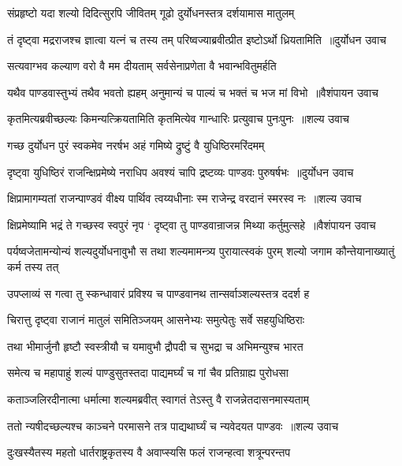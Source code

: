 \twolineshloka
{संप्रहृष्टो यदा शल्यो दिदित्सुरपि जीवितम्}
{गूढो दुर्योधनस्तत्र दर्शयामास मातुलम्}


\threelineshloka
{तं दृष्ट्वा मद्रराजश्च ज्ञात्वा यत्नं च तस्य तम्}
{परिष्वज्याब्रवीत्प्रीत इष्टोऽर्थो ध्रियतामिति ॥दुर्योधन उवाच}
{}


\twolineshloka
{सत्यवाग्भव कल्याण वरो वै मम दीयताम्}
{सर्वसेनाप्रणेता वै भवान्भवितुमर्हति}


\threelineshloka
{यथैव पाण्डवास्तुभ्यं तथैव भवतो ह्यहम्}
{अनुमान्यं च पाल्यं च भक्तं च भज मां विभो ॥वैशंपायन उवाच}
{}


\threelineshloka
{कृतमित्यब्रवीच्छल्यः किमन्यत्क्रियतामिति}
{कृतमित्येव गान्धारिः प्रत्युवाच पुनःपुनः ॥शल्य उवाच}
{}


\twolineshloka
{गच्छ दुर्योधन पुरं स्वकमेव नरर्षभ}
{अहं गमिष्ये द्रुष्टुं वै युधिष्ठिरमरिंदमम्}


\threelineshloka
{दृष्ट्वा युधिष्ठिरं राजन्क्षिप्रमेष्ये नराधिप}
{अवश्यं चापि द्रष्टव्यः पाण्डवः पुरुषर्षभः ॥दुर्योधन उवाच}
{}


\threelineshloka
{क्षिप्रामागम्यतां राजन्पाण्डवं वीक्ष्य पार्थिव}
{त्वय्यधीनाः स्म राजेन्द्र वरदानं स्मरस्व नः ॥शल्य उवाच}
{}


\threelineshloka
{क्षिप्रमेष्यामि भद्रं ते गच्छस्व स्वपुरं नृप}
{` दृष्ट्वा तु पाण्डवान्राजन्न मिथ्या कर्तुमुत्सहे ॥वैशंपायन उवाच}
{}


पर्यष्वजेतामन्योन्यं शल्यदुर्योधनावुभौ
\twolineshloka
{स तथा शल्यमामन्त्र्य पुरायात्स्वकं पुरम्}
{शल्यो जगाम कौन्तेयानाख्यातुं कर्म तस्य तत्}


\twolineshloka
{उपप्लाव्यं स गत्वा तु स्कन्धावारं प्रविश्य च}
{पाण्डवानथ तान्सर्वाञ्शल्यस्तत्र ददर्श ह}


\twolineshloka
{चिरात्तु दृष्ट्वा राजानं मातुलं समितिञ्जयम्}
{आसनेभ्यः समुत्पेतुः सर्वे सहयुधिष्ठिराः}


\twolineshloka
{तथा भीमार्जुनौ हृष्टौ स्वस्त्रीयौ च यमावुभौ}
{द्रौपदी च सुभद्रा च अभिमन्युश्च भारत}


\twolineshloka
{समेत्य च महापाहुं शल्यं पाण्डुसुतस्तदा}
{पाद्यमर्घ्यं च गां चैव प्रतिग्राह्य पुरोधसा}


\twolineshloka
{कताञ्जलिरदीनात्मा धर्मात्मा शल्यमब्रवीत्}
{स्वागतं तेऽस्तु वै राजन्नेतदासनमास्यताम्}


\threelineshloka
{ततो न्यषीदच्छल्यश्च काञ्चने परमासने}
{तत्र पाद्यथार्घ्यं च न्यवेदयत पाण्डवः ॥शल्य उवाच}
{}


\twolineshloka
{दुःखस्यैतस्य महतो धार्तराष्ट्रकृतस्य वै}
{अवाप्स्यसि फलं राजन्हत्वा शत्रून्परन्तप}


